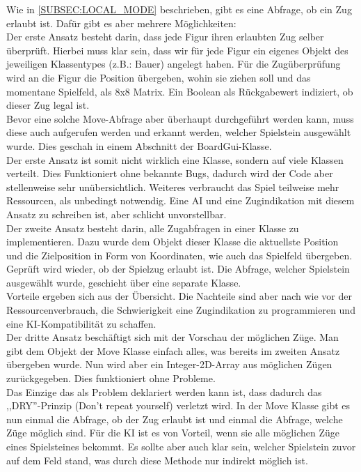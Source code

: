 \documentclass[12pt,a4paper]{article}
\begin{document}
Wie in \ref{SUBSEC:LOCAL_MODE} beschrieben, gibt es eine Abfrage, ob ein Zug erlaubt ist. Dafür gibt es aber mehrere Möglichkeiten:\\
Der erste Ansatz besteht darin, dass jede Figur ihren erlaubten Zug selber überprüft. Hierbei muss klar sein, dass wir für jede Figur ein eigenes Objekt des jeweiligen Klassentypes (z.B.: Bauer) angelegt haben. Für die Zugüberprüfung wird an die Figur die Position übergeben, wohin sie ziehen soll und das momentane Spielfeld, als 8x8 Matrix. Ein Boolean als Rückgabewert indiziert, ob dieser Zug legal ist. \\
Bevor eine solche Move-Abfrage aber überhaupt durchgeführt werden kann, muss diese auch aufgerufen werden und erkannt werden, welcher Spielstein ausgewählt wurde. Dies geschah in einem Abschnitt der BoardGui-Klasse. \\
Der erste Ansatz ist somit nicht wirklich eine Klasse, sondern auf viele Klassen verteilt. Dies Funktioniert ohne bekannte Bugs, dadurch wird der Code aber stellenweise sehr unübersichtlich. Weiteres verbraucht das Spiel teilweise mehr Ressourcen, als unbedingt notwendig. Eine AI und eine Zugindikation mit diesem Ansatz zu schreiben ist, aber schlicht unvorstellbar. \\[2ex]
Der zweite Ansatz besteht darin, alle Zugabfragen in einer Klasse zu implementieren. Dazu wurde dem Objekt dieser Klasse die aktuellste Position und die Zielposition in Form von Koordinaten, wie auch das Spielfeld übergeben. Geprüft wird wieder, ob der Spielzug erlaubt ist. Die Abfrage, welcher Spielstein ausgewählt wurde, geschieht über eine separate Klasse.\\ 
Vorteile ergeben sich aus der Übersicht. Die Nachteile sind aber nach wie vor der Ressourcenverbrauch, die Schwierigkeit eine Zugindikation zu programmieren und eine KI-Kompatibilität zu schaffen.\\[2ex]
Der dritte Ansatz beschäftigt sich mit der Vorschau der möglichen Züge. Man gibt dem Objekt der Move Klasse einfach alles, was bereits im zweiten Ansatz übergeben wurde. Nun wird aber ein Integer-2D-Array aus möglichen Zügen zurückgegeben. Dies funktioniert ohne Probleme. \\
Das Einzige das als Problem deklariert werden kann ist, dass dadurch das ,,DRY''-Prinzip (Don't repeat yourself)  verletzt wird. In der Move Klasse gibt es nun einmal die Abfrage, ob der Zug erlaubt ist und einmal die Abfrage, welche Züge möglich sind. Für die KI ist es von Vorteil, wenn sie alle möglichen Züge eines Spielsteines bekommt. Es sollte aber auch klar sein, welcher Spielstein zuvor auf dem Feld stand, was durch diese Methode nur indirekt möglich ist. \\[2ex]
\end{document}
